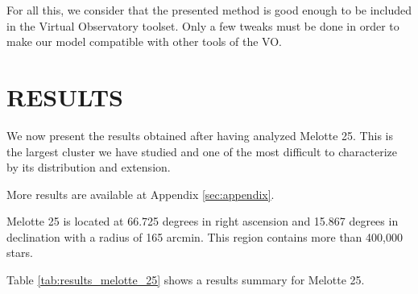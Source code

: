 \documentclass[11pt,a4paper,english,twocolumn]{article}
\begin{document}
For all this, we consider that the presented method is good enough to be included
in the Virtual Observatory toolset. Only a few tweaks must be done in order to make
our model compatible with other tools of the VO.

\section{RESULTS}
\label{sec:results}

We now present the results obtained after having analyzed Melotte 25.
This is the largest cluster we have studied and one of the most difficult
to characterize by its distribution and extension.

More results are available at Appendix \ref{sec:appendix}.

Melotte 25 is located at 66.725 degrees in right ascension and 15.867
degrees in declination with a radius of 165 arcmin.
This region contains more than 400,000 stars.

Table \ref{tab:results_melotte_25} shows a results summary for Melotte 25.

\begin{table}[htbp]
  \begin{center}
    \caption{Melotte 25 results.}
    \label{tab:results_melotte_25}
  \end{center}
\end{table}
\end{document}
